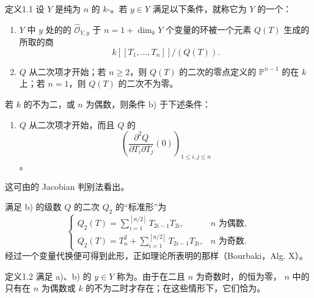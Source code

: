 \begin{SGAresult}{定义}{1.1}
设 $Y$ 是纯为 $n$ 的 $k$-。若 $y\in Y$ 满足以下条件，就称它为 $Y$ 的一个：
\begin{enumerate}
\item[a)] $Y$ 中 $y$ 处的的 $\widehat{\mathcal O}_{Y,y}$ 于 $n=1+\dim_kY$ 个变量的环被一个元素 $Q(T)$ 生成的所取的商
\[
k[[T_1,\ldots,T_n]]/(Q(T)).
\]
\item[b)] $Q$ 从二次项才开始；若 $n\geq2$，则 $Q(T)$ 的二次的零点定义的 $\mathbb P^{n-1}$ 的在 $k$ 上；若 $n=1$，则 $Q(T)$ 的二次不为零。
\end{enumerate}
若 $k$ 的不为二，或 $n$ 为偶数，则条件 b) 于下述条件：
\begin{enumerate}
\item[b$'$)] $Q$ 从二次项才开始，而且 $Q$ 的
\[
\left(\frac{\partial^2Q}{\partial T_i\partial T_j}(0)\right)_{1\leq i,j\leq n}
\]
。
\end{enumerate}
\end{SGAresult}
这可由的 Jacobian 判别法看出。

满足 b) 的级数 $Q$ 的二次 $Q_2$ 的“标准形”为
\[
\begin{cases}
Q_2(T)=\displaystyle\sum_{i=1}^{[n/2]}T_{2i-1}T_{2i},&n\text{ 为偶数},\\[4pt]
Q_2(T)=T_n^2+\displaystyle\sum_{i=1}^{[n/2]}T_{2i-1}T_{2i},&n\text{ 为奇数}.
\end{cases}\tag{1.1.1}
\]
经过一个变量代换便可得到此形，正如理论所表明的那样（Bourbaki，Alg. X）。

\begin{SGAresult}{定义}{1.2}
满足 a)、b) 的 $y\in Y$ 称为。由于在二且 $n$ 为奇数时，的恒为零， $n$ 中的只有在 $n$ 为偶数或 $k$ 的不为二时才存在；在这些情形下，它们恰为。
\end{SGAresult}

